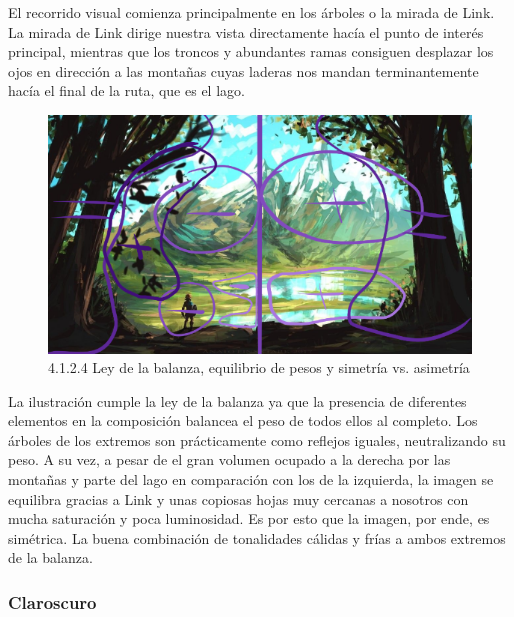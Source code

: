 \documentclass[12pt]{article}
\begin{document}
    El recorrido visual comienza principalmente en los árboles o la mirada de Link. La mirada de Link dirige nuestra vista directamente hacía el punto de interés principal, mientras que los troncos y abundantes ramas consiguen desplazar los ojos en dirección a las montañas cuyas laderas nos mandan terminantemente hacía el final de la ruta, que es el lago.

    \begin{figure}[H]
      \centering
      \includegraphics[width=\textwidth]{images/Nerea/Nerea Zelda concept 124.PNG}
      \caption{\small 4.1.2.4 Ley de la balanza, equilibrio de pesos y simetría vs. asimetría}
    \end{figure}

    La ilustración cumple la ley de la balanza ya que la presencia de diferentes elementos en la composición balancea el peso de todos ellos al completo. Los árboles de los extremos son prácticamente como reflejos iguales, neutralizando su peso. A su vez, a pesar de el gran volumen ocupado a la derecha por las montañas y parte del lago en comparación con los de la izquierda, la imagen se equilibra gracias a Link y unas copiosas hojas muy cercanas a nosotros con mucha saturación y poca luminosidad. Es por esto que la imagen, por ende, es simétrica. La buena combinación de tonalidades cálidas y frías a ambos extremos de la balanza.


        \subsubsection{Claroscuro}
\end{document}

